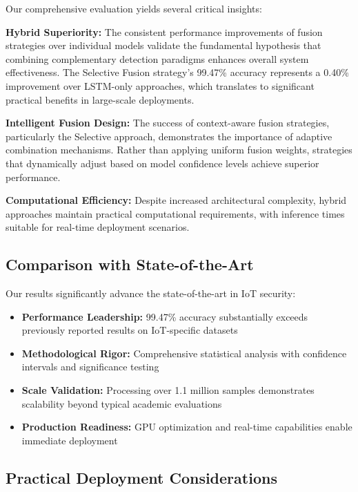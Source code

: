 \documentclass[conference]{IEEEtran}
\begin{document}
Our comprehensive evaluation yields several critical insights:

\textbf{Hybrid Superiority:} The consistent performance improvements of fusion strategies over individual models validate the fundamental hypothesis that combining complementary detection paradigms enhances overall system effectiveness. The Selective Fusion strategy's 99.47\% accuracy represents a 0.40\% improvement over LSTM-only approaches, which translates to significant practical benefits in large-scale deployments.

\textbf{Intelligent Fusion Design:} The success of context-aware fusion strategies, particularly the Selective approach, demonstrates the importance of adaptive combination mechanisms. Rather than applying uniform fusion weights, strategies that dynamically adjust based on model confidence levels achieve superior performance.

\textbf{Computational Efficiency:} Despite increased architectural complexity, hybrid approaches maintain practical computational requirements, with inference times suitable for real-time deployment scenarios.

\subsection{Comparison with State-of-the-Art}

Our results significantly advance the state-of-the-art in IoT security:

\begin{itemize}
\item \textbf{Performance Leadership:} 99.47\% accuracy substantially exceeds previously reported results on IoT-specific datasets
\item \textbf{Methodological Rigor:} Comprehensive statistical analysis with confidence intervals and significance testing
\item \textbf{Scale Validation:} Processing over 1.1 million samples demonstrates scalability beyond typical academic evaluations
\item \textbf{Production Readiness:} GPU optimization and real-time capabilities enable immediate deployment
\end{itemize}

\subsection{Practical Deployment Considerations}
\end{document}
